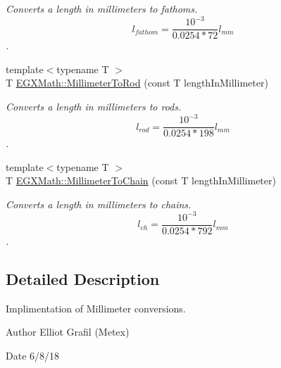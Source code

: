 \begin{DoxyCompactItemize}
\begin{DoxyCompactList}\small\item\em Converts a length in millimeters to fathoms. \[ l_{fathom}= \frac{10^{-3}}{0.0254 * 72} l_{mm} \]. \end{DoxyCompactList}\item 
{\footnotesize template$<$typename T $>$ }\\T \mbox{\hyperlink{group___e_g_x_math-_conversions-_length_conversions-_s_i-_millimeter-_surveyors_ga658a03332f16e17bdd23bd770091b221}{E\+G\+X\+Math\+::\+Millimeter\+To\+Rod}} (const T length\+In\+Millimeter)
\begin{DoxyCompactList}\small\item\em Converts a length in millimeters to rods. \[ l_{rod}= \frac{10^{-3}}{0.0254 * 198} l_{mm} \]. \end{DoxyCompactList}\item 
{\footnotesize template$<$typename T $>$ }\\T \mbox{\hyperlink{group___e_g_x_math-_conversions-_length_conversions-_s_i-_millimeter-_surveyors_gaacdbed15976b36734f17c99e024d96cd}{E\+G\+X\+Math\+::\+Millimeter\+To\+Chain}} (const T length\+In\+Millimeter)
\begin{DoxyCompactList}\small\item\em Converts a length in millimeters to chains. \[ l_{ch}= \frac{10^{-3}}{0.0254 * 792} l_{mm} \]. \end{DoxyCompactList}\end{DoxyCompactItemize}


\subsection{Detailed Description}
Implimentation of Millimeter conversions. 

\begin{DoxyAuthor}{Author}
Elliot Grafil (Metex) 
\end{DoxyAuthor}
\begin{DoxyDate}{Date}
6/8/18 
\end{DoxyDate}
